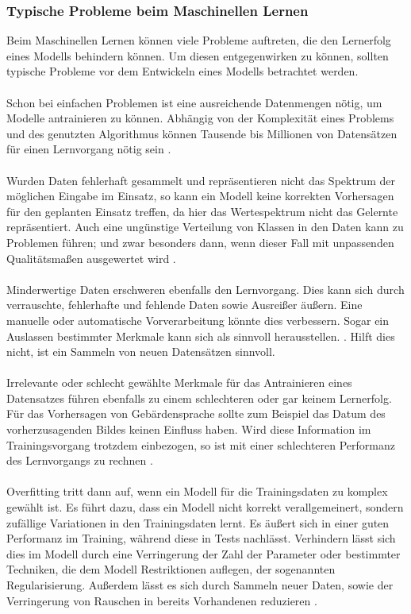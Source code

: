 \documentclass[11pt,bibliography=totocnumbered]{scrartcl}
\begin{document}
\subsubsection{Typische Probleme beim Maschinellen Lernen}
Beim Maschinellen Lernen können viele Probleme auftreten, die den Lernerfolg eines Modells behindern können. Um diesen entgegenwirken zu können, sollten typische Probleme vor dem Entwickeln eines Modells betrachtet werden.
\\\\
Schon bei einfachen Problemen ist eine ausreichende Datenmengen nötig, um Modelle antrainieren zu können. Abhängig von der Komplexität eines Problems und des genutzten Algorithmus können Tausende bis Millionen von Datensätzen für einen Lernvorgang nötig sein \cite[S.23]{MACHINE_LEARNING}\cite[S.4]{BA}.
\\\\
Wurden Daten fehlerhaft gesammelt und repräsentieren nicht das Spektrum der möglichen Eingabe im Einsatz, so kann ein Modell keine korrekten Vorhersagen für den geplanten Einsatz treffen, da hier das Wertespektrum nicht das Gelernte repräsentiert. Auch eine ungünstige Verteilung von Klassen in den Daten kann zu Problemen führen; und zwar besonders dann, wenn dieser Fall mit unpassenden Qualitätsmaßen ausgewertet wird \cite[S.24-25]{MACHINE_LEARNING}\cite[S.4]{BA}.
\\\\
Minderwertige Daten erschweren ebenfalls den Lernvorgang. Dies kann sich durch verrauschte, fehlerhafte und fehlende Daten sowie Ausreißer äußern. Eine manuelle oder automatische Vorverarbeitung könnte dies verbessern. Sogar ein Auslassen bestimmter Merkmale kann sich als sinnvoll herausstellen. \cite[S.26]{MACHINE_LEARNING}\cite[S.3]{BA}. Hilft dies nicht, ist ein Sammeln von neuen Datensätzen sinnvoll.
\\\\
Irrelevante oder schlecht gewählte Merkmale für das Antrainieren eines Datensatzes führen ebenfalls zu einem schlechteren oder gar keinem Lernerfolg. Für das Vorhersagen von Gebärdensprache sollte zum Beispiel das Datum des vorherzusagenden Bildes keinen Einfluss haben. Wird diese Information im Trainingsvorgang trotzdem einbezogen, so ist mit einer schlechteren Performanz des Lernvorgangs zu rechnen \cite[S.26]{MACHINE_LEARNING}\cite[S.4]{BA}. 
\\\\
Overfitting tritt dann auf, wenn ein Modell für die Trainingsdaten zu komplex gewählt ist. Es führt dazu, dass ein Modell nicht korrekt verallgemeinert, sondern zufällige Variationen in den Trainingsdaten lernt. Es äußert sich in einer guten Performanz im Training, während diese in Tests nachlässt. Verhindern lässt sich dies im Modell durch eine Verringerung der Zahl der Parameter oder bestimmter Techniken, die dem Modell Restriktionen auflegen, der sogenannten Regularisierung. Außerdem lässt es sich durch Sammeln neuer Daten, sowie der Verringerung von Rauschen in bereits Vorhandenen reduzieren \cite[S.27]{MACHINE_LEARNING}\cite[S.13]{BA}.
\end{document}
